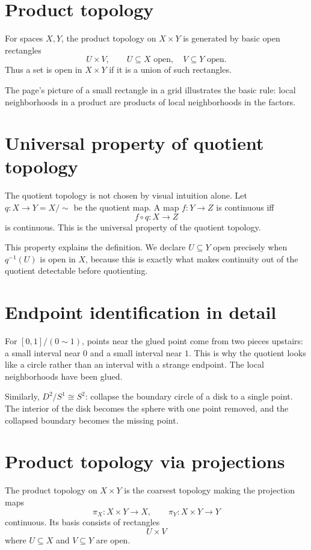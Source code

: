\section{Product topology}

For spaces \(X,Y\), the product topology on \(X\times Y\) is generated by basic open rectangles
\[
  U\times V,\qquad U\subseteq X\text{ open},\quad V\subseteq Y\text{ open}.
\]
Thus a set is open in \(X\times Y\) if it is a union of such rectangles.

The page's picture of a small rectangle in a grid illustrates the basic rule: local neighborhoods in a product are products of local neighborhoods in the factors.


\section{Universal property of quotient topology}

The quotient topology is not chosen by visual intuition alone.  Let \(q:X\to Y=X/{\sim}\) be the quotient map.  A map \(f:Y\to Z\) is continuous iff
\[
  f\circ q:X\to Z
\]
is continuous.  This is the universal property of the quotient topology.

This property explains the definition.  We declare \(U\subseteq Y\) open precisely when \(q^{-1}(U)\) is open in \(X\), because this is exactly what makes continuity out of the quotient detectable before quotienting.

\section{Endpoint identification in detail}

For \([0,1]/(0\sim1)\), points near the glued point come from two pieces upstairs: a small interval near \(0\) and a small interval near \(1\).  This is why the quotient looks like a circle rather than an interval with a strange endpoint.  The local neighborhoods have been glued.

Similarly, \(D^2/S^1\cong S^2\): collapse the boundary circle of a disk to a single point.  The interior of the disk becomes the sphere with one point removed, and the collapsed boundary becomes the missing point.

\section{Product topology via projections}

The product topology on \(X\times Y\) is the coarsest topology making the projection maps
\[
  \pi_X:X\times Y\to X,
  \qquad
  \pi_Y:X\times Y\to Y
\]
continuous.  Its basis consists of rectangles
\[
  U\times V
\]
where \(U\subseteq X\) and \(V\subseteq Y\) are open.

